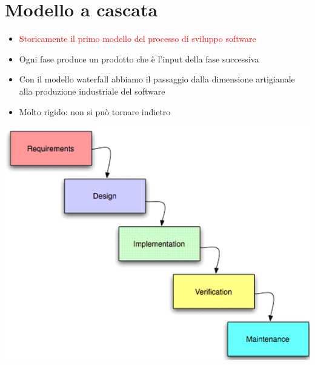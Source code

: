 \documentclass[12pt, a4paper]{report}
\begin{document}
\section{Modello a cascata}
\begin{minipage}{0.5\textwidth}
\begin{itemize}
    \item \textcolor{red}{Storicamente il primo modello del processo di sviluppo software}
    \item Ogni fase produce un prodotto che è l'input della fase successiva
    \item Con il modello waterfall abbiamo il passaggio dalla dimensione artigianale alla produzione industriale del software
    \item Molto rigido: non si può tornare indietro
\end{itemize}
\end{minipage}
\hspace{0.05\textwidth}
\begin{minipage}{0.4\textwidth}
    \includegraphics[width=\linewidth]{Immagini/waterfall.png}
\end{minipage}
\end{document}
